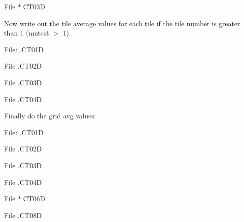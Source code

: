 File $\ast$.C\+T03\+D

Now write out the tile average values for each tile if the tile number is greater than 1 (nmtest $>$ 1).

File\+: .C\+T01\+D

File .C\+T02\+D

File .C\+T03\+D

File .C\+T04\+D

Finally do the grid avg values\+:

File\+: .C\+T01\+D

File .C\+T02\+D

File .C\+T03\+D

File .C\+T04\+D

File $\ast$.C\+T06\+D

File .C\+T08\+D 